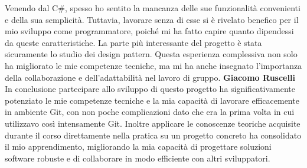 \documentclass[a4paper,12pt]{report}
\begin{document}
Venendo dal C\#, spesso ho sentito la mancanza delle sue funzionalità convenienti e della sua semplicità. Tuttavia, lavorare senza di esse si è rivelato benefico per il mio sviluppo come programmatore, poiché mi ha fatto capire quanto dipendessi da queste caratteristiche.
La parte più interessante del progetto è stata sicuramente lo studio dei design pattern. Questa esperienza complessiva non solo ha migliorato le mie competenze tecniche, ma mi ha anche insegnato l'importanza della collaborazione e dell'adattabilità nel lavoro di gruppo.\newline\newline
\textbf{Giacomo Ruscelli}\newline
In conclusione partecipare allo sviluppo di questo progetto ha significativamente potenziato le mie competenze tecniche e la mia capacità di lavorare efficacemente in ambiente Git, con non poche complicazioni dato che era la prima volta in cui utilizzavo così intensamente Git. Inoltre applicare le conoscenze teoriche acquisite durante il corso direttamente nella pratica su un progetto concreto ha consolidato il mio apprendimento, migliorando la mia capacità di progettare soluzioni software robuste e di collaborare in modo efficiente con altri sviluppatori.
\end{document}
